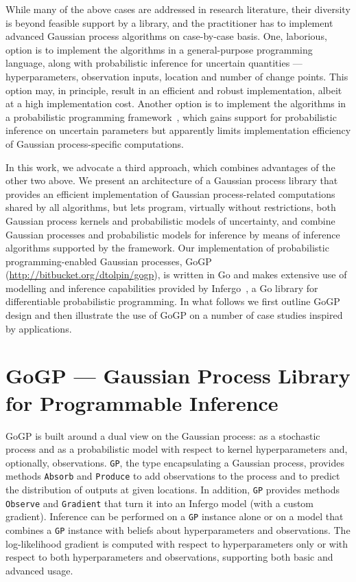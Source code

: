 \documentclass[sigplan,review]{acmart}\settopmatter{printfolios=true,printccs=false,printacmref=false}
\begin{document}
While many of the above cases are addressed in research
literature, their diversity is beyond feasible support by a
library, and the practitioner has to implement advanced Gaussian
process algorithms on case-by-case basis. One, laborious, option
is to implement the algorithms in a general-purpose programming
language, along with probabilistic inference for uncertain
quantities --- hyperparameters, observation inputs, location and
number of change points.  This option may, in principle, result
in an efficient and robust implementation, albeit at a high
implementation cost. Another option is to implement the
algorithms in a probabilistic programming
framework~\cite{TMY+16,Stan17,GXG18},
which gains support for probabilistic inference on uncertain
parameters but apparently limits implementation efficiency of
Gaussian process-specific computations.

In this work, we advocate a third approach, which combines
advantages of the other two above. We present an architecture of
a Gaussian process library that provides an efficient
implementation of Gaussian process-related computations shared
by all algorithms, but lets program, virtually without
restrictions, both Gaussian process kernels and probabilistic
models of uncertainty, and combine Gaussian processes and
probabilistic models for inference by means of inference
algorithms supported by the framework. Our implementation of
probabilistic programming-enabled Gaussian processes, GoGP
(\url{http://bitbucket.org/dtolpin/gogp}), is written in Go and
makes extensive use of modelling and inference capabilities
provided by Infergo~\cite{T19}, a Go library for differentiable
probabilistic programming. In what follows we first outline GoGP
design  and then illustrate the use of GoGP on a number of case
studies inspired by applications.

\section{GoGP --- Gaussian Process Library for Programmable Inference}

GoGP is built around a dual view on the Gaussian process: as a
stochastic process and as a probabilistic model with respect
to kernel hyperparameters and, optionally, observations.
\lstinline{GP}, the type encapsulating a Gaussian process,
provides methods \lstinline{Absorb} and \lstinline{Produce} to 
add observations to the process and to predict the distribution
of outputs at given locations. In addition, \lstinline{GP}
provides methods \lstinline{Observe} and \lstinline{Gradient}
that turn it into an Infergo model (with a custom gradient).
Inference can be performed on a \lstinline{GP} instance alone
or on a model that combines a \lstinline{GP} instance with
beliefs about hyperparameters and observations.  The
log-likelihood gradient is computed with respect to
hyperparameters only or with respect to both hyperparameters and
observations, supporting both basic and advanced usage.
\end{document}
